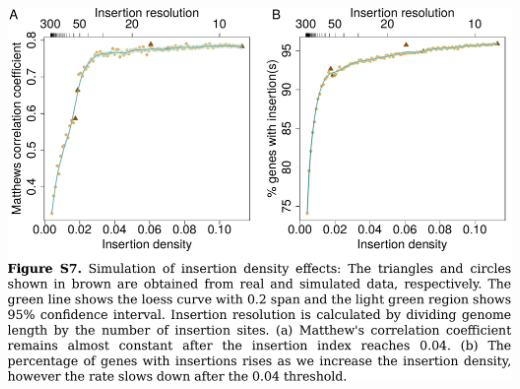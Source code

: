 \documentclass{article}
\newcommand{\Newpage}{\end{preview}\begin{preview}}
\begin{document}
\begin{preview}
\includegraphics{suppl7.pdf}
\Newpage

\end{preview}
\end{document}
